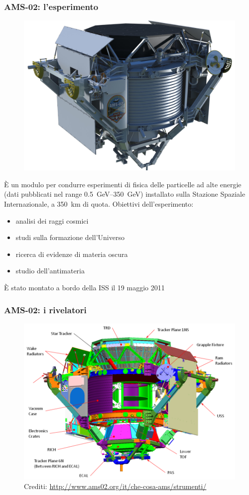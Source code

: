 \documentclass[10pt]{beamer}
\begin{document}
\begin{frame}
  \frametitle{AMS-02: l'esperimento}
  \begin{figure}
    \centering
    \includegraphics[width=0.3\columnwidth]{ams}
  \end{figure}
  È un modulo per condurre esperimenti di fisica delle particelle ad alte
  energie (dati pubblicati nel range
  \SIrange[range-phrase=--]{0.5}{350}{\giga\electronvolt}) installato sulla
  Stazione Spaziale Internazionale, a \SI{350}{\kilo\metre} di quota.  Obiettivi
  dell'esperimento:
  \begin{itemize}
  \item analisi dei \alert{raggi cosmici}
  \item studi sulla \alert{formazione dell'Universo}
  \item ricerca di evidenze di \alert{materia oscura}
  \item studio dell'\alert{antimateria}
  \end{itemize}
  È stato montato a bordo della ISS il 19 maggio 2011
\end{frame}

\begin{frame}
  \frametitle{AMS-02: i rivelatori}
  \begin{figure}
    \centering
    \includegraphics[width=.78\columnwidth]{ams-rivelatori}
    \caption{Crediti: \url{http://www.ams02.org/it/che-cosa-ams/strumenti/}}
  \end{figure}
\end{frame}
\end{document}
